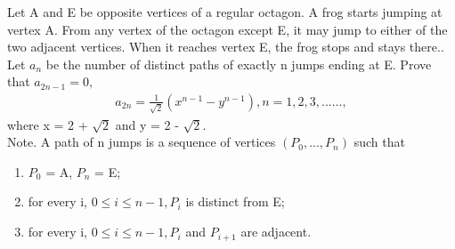 \item Let A and E be opposite vertices of a regular octagon. A frog starts jumping at vertex A. From any vertex of the octagon except E, it may jump to either of the two adjacent vertices. When it reaches vertex E, the frog stops and stays there.. Let $a_n$ be the number of distinct paths of exactly n jumps ending at E. Prove that $a_{2n - 1} = 0,$
\begin{align*}
 a_{2n} = \frac{1}{\sqrt{2}}(x^{n-1} - y^{n-1}), n = 1, 2, 3,......,
\end{align*}
where x = 2 + $\sqrt{2}$ and y = 2 - $\sqrt{2}$.\\
Note. A path of n jumps is a sequence of vertices $(P_0, ..., P_n)$ such that
\begin{enumerate}
\item $P_0$ = A, $P_n$ = E;
\item for every i, $0 \leq i \leq n - 1, P_i$ is distinct from E;
\item for every i, $0 \leq i \leq n - 1, P_i$ and $ P_{i+1}$ are adjacent.
\end{enumerate}

